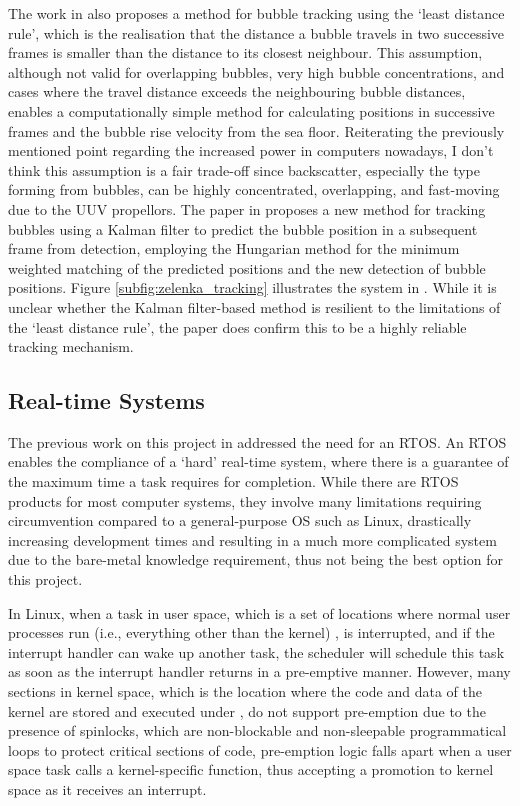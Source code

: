 The work in \cite{thomanekAutomatedGasBubble2010} also proposes a method for bubble tracking using the `least distance rule', which is the realisation that the distance a bubble travels in two successive frames is smaller than the distance to its closest neighbour. This assumption, although not valid for overlapping bubbles, very high bubble concentrations, and cases where the travel distance exceeds the neighbouring bubble distances, enables a computationally simple method for calculating positions in successive frames and the bubble rise velocity from the sea floor. Reiterating the previously mentioned point regarding the increased power in computers nowadays, I don't think this assumption is a fair trade-off since backscatter, especially the type forming from bubbles, can be highly concentrated, overlapping, and fast-moving due to the UUV propellors. The paper in \cite{zelenkaGasBubbleShape2014} proposes a new method for tracking bubbles using a Kalman filter \cite{kalmanNewApproachLinear1960} to predict the bubble position in a subsequent frame from detection, employing the Hungarian method \cite{kuhnHungarianMethodAssignment1955} for the minimum weighted matching of the predicted positions and the new detection of bubble positions. Figure \ref{subfig:zelenka_tracking} illustrates the system in \cite{zelenkaGasBubbleShape2014}. While it is unclear whether the Kalman filter-based method is resilient to the limitations of the `least distance rule', the paper \cite{zelenkaGasBubbleShape2014} does confirm this to be a highly reliable tracking mechanism.

\subsection{Real-time Systems}
\label{bi_rt}
The previous work on this project in \cite{katieshepherdMachineVisionBased2023} addressed the need for an RTOS. An RTOS enables the compliance of a `hard' real-time system, where there is a guarantee of the maximum time a task requires for completion. While there are RTOS products for most computer systems, they involve many limitations requiring circumvention compared to a general-purpose OS such as Linux, drastically increasing development times and resulting in a much more complicated system due to the bare-metal knowledge requirement, thus not being the best option for this project.

In Linux, when a task in user space, which is a set of locations where normal user processes run (i.e., everything other than the kernel) \cite{nlightnfotisAnswerWhatDifference2013}, is interrupted, and if the interrupt handler can wake up another task, the scheduler will schedule this task as soon as the interrupt handler returns in a pre-emptive manner. However, many sections in kernel space, which is the location where the code and data of the kernel are stored and executed under \cite{nlightnfotisAnswerWhatDifference2013}, do not support pre-emption due to the presence of spinlocks, which are non-blockable and non-sleepable programmatical loops to protect critical sections of code, pre-emption logic falls apart when a user space task calls a kernel-specific function, thus accepting a promotion to kernel space as it receives an interrupt.

